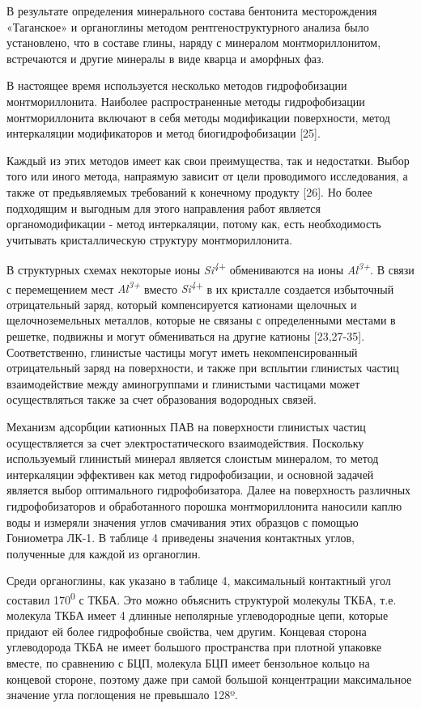 \begin{multicols}{2}
В результате определения минерального состава бентонита месторождения
«Таганское» и органоглины методом рентгеноструктурного анализа было
установлено, что в составе глины, наряду с минералом монтмориллонитом,
встречаются и другие минералы в виде кварца и аморфных фаз.

В настоящее время используется несколько методов гидрофобизации
монтмориллонита. Наиболее распространенные методы гидрофобизации
монтмориллонита включают в себя методы модификации поверхности, метод
интеркаляции модификаторов и метод биогидрофобизации {[}25{]}.

Каждый из этих методов имеет как свои преимущества, так и недостатки.
Выбор того или иного метода, напраямую зависит от цели проводимого
исследования, а также от предьявляемых требований к конечному продукту
{[}26{]}. Но более подходящим и выгодным для этого направления работ
является органомодификации - метод интеркаляции, потому как, есть
необходимость учитывать кристаллическую структуру монтмориллонита.

В структурных схемах некоторые ионы
\emph{Si\textsuperscript{4}}\textsuperscript{+} обмениваются на ионы
\emph{Al\textsuperscript{3+}}. В связи с перемещением мест
\emph{Al\textsuperscript{3+}} вместо
\emph{Si\textsuperscript{4}}\textsuperscript{+} в их кристалле создается
избыточный отрицательный заряд, который компенсируется катионами
щелочных и щелочноземельных металлов, которые не связаны с определенными
местами в решетке, подвижны и могут обмениваться на другие катионы
{[}23,27-35{]}. Соответственно, глинистые частицы могут иметь
некомпенсированный отрицательный заряд на поверхности, и также при
всплытии глинистых частиц взаимодействие между аминогруппами и
глинистыми частицами может осуществляться также за счет образования
водородных связей.

Механизм адсорбции катионных ПАВ на поверхности глинистых частиц
осуществляется за счет электростатического взаимодействия. Поскольку
используемый глинистый минерал является слоистым минералом, то метод
интеркаляции эффективен как метод гидрофобизации, и основной задачей
является выбор оптимального гидрофобизатора. Далее на поверхность
различных гидрофобизаторов и обработанного порошка монтмориллонита
наносили каплю воды и измеряли значения углов смачивания этих образцов с
помощью Гониометра ЛК-1. В таблице 4 приведены значения контактных
углов, полученные для каждой из органоглин.

Среди органоглины, как указано в таблице 4, максимальный контактный угол
составил 170\textsuperscript{0} с ТКБА. Это можно объяснить структурой
молекулы ТКБА, т.е. молекула ТКБА имеет 4 длинные неполярные
углеводородные цепи, которые придают ей более гидрофобные свойства, чем
другим. Концевая сторона углеводорода ТКБА не имеет большого
пространства при плотной упаковке вместе, по сравнению с БЦП, молекула
БЦП имеет бензольное кольцо на концевой стороне, поэтому даже при самой
большой концентрации максимальное значение угла поглощения не превышало
128º.


\end{multicols}
